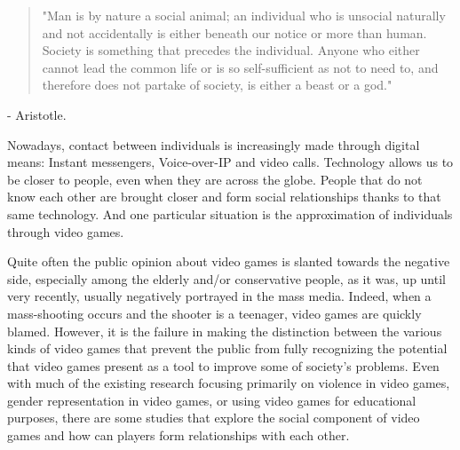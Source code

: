 \documentclass[runningheads]{llncs}
\begin{document}
\begin{quotation}
"Man is by nature a social animal; an individual who is unsocial naturally and not accidentally is either beneath our notice or more than human. Society is something that precedes the individual. Anyone who either cannot lead the common life or is so self-sufficient as not to need to, and therefore does not partake of society, is either a beast or a god."
\end{quotation}
\par - Aristotle.
\bigskip
\par Nowadays, contact between individuals is increasingly made through digital means: Instant messengers, Voice-over-IP and video calls. Technology allows us to be closer to people, even when they are across the globe. People that do not know each other are brought closer and form social relationships thanks to that same technology. And one particular situation is the approximation of individuals through video games.
\par Quite often the public opinion about video games is slanted towards the negative side, especially among the elderly and/or conservative people, as it was, up until very recently, usually negatively portrayed in the mass media. Indeed, when a mass-shooting occurs and the shooter is a teenager, video games are quickly blamed. However, it is the failure in making the distinction between the various kinds of video games that prevent the public from fully recognizing the potential that video games present as a tool to improve some of society's problems. Even with much of the existing research focusing primarily on violence in video games, gender representation in video games, or using video games for educational purposes, there are some studies that explore the social component of video games and how can players form relationships with each other.
\end{document}
